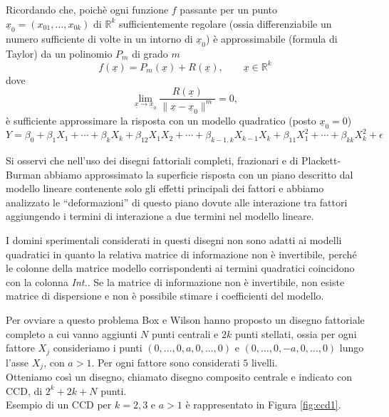 \documentclass[
  11pt,
]{book}
\begin{document}
Ricordando che, poichè ogni funzione \(f\) passante per un punto \(\underline{x}_0=(x_{01},\dots,x_{0k})\) di \(\mathbb{R}^k\) sufficientemente regolare (ossia differenziabile un numero sufficiente di volte in un intorno di \(\underline{x}_0\)) è approssimabile (formula di Taylor) da un polinomio \(P_m\) di grado \(m\)
\[
    f(\underline{x})=P_m(\underline{x})+R(\underline{x}), \qquad \underline{x} \in \mathbb{R}^k
\]
dove
\[
    \lim_{\underline{x} \to \underline{x}_0}
    \frac{R(\underline{x})}{\|\underline{x}-\underline{x}_0 \|^m}=0,
\]
è sufficiente approssimare la risposta con un modello quadratico (posto \(\underline{x}_0=0\))
\[
     Y=\beta_0+\beta_1 X_1+\cdots +\beta_k X_k +
    \beta_{12}X_1X_2+\cdots+\beta_{k-1, k}X_{k-1}  X_k+
    \beta_{11}X_1^2+\cdots+\beta_{kk}X_k^2+\epsilon 
\]

Si osservi che nell'uso dei disegni fattoriali completi, frazionari e di Plackett-Burman abbiamo approssimato la superficie risposta con un piano descritto dal modello lineare contenente solo gli effetti principali dei fattori e abbiamo analizzato le ``deformazioni'' di questo piano dovute alle interazione tra fattori aggiungendo i termini di interazione a due termini nel modello lineare.

I domini sperimentali considerati in questi disegni non sono adatti ai modelli quadratici in quanto la relativa matrice di informazione non è invertibile, perché le colonne della matrice modello corrispondenti ai termini quadratici coincidono con la colonna \emph{Int.}. Se la matrice di informazione non è invertibile, non esiste matrice di dispersione e non è possibile stimare i coefficienti del modello.

Per ovviare a questo problema Box e Wilson hanno proposto un disegno fattoriale completo a cui vanno aggiunti \(N\) punti centrali e \(2k\) punti stellati, ossia per ogni fattore \(X_j\) consideriamo i punti \((0,\dots,0,a,0,\dots,0)\) e \((0,\dots,0,-a,0,\dots,0)\) lungo l'asse \(X_j\), con \(a>1\). Per ogni fattore sono considerati \(5\) livelli.\\
Otteniamo così un disegno, chiamato disegno composito centrale e indicato con CCD, di \(2^k+2k+N\) punti.\\
Esempio di un CCD per \(k=2,3\) e \(a>1\) è rappresentato in Figura \ref{fig:ccd1}.
\end{document}
